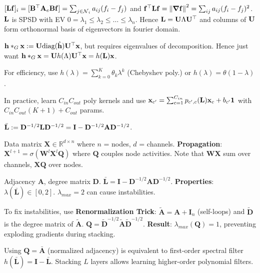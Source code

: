 \begin{theorem}
    \([\vb{L} \vb f]_i = [\vb{B}^\top \vb{A}_e \vb{B} \vb f] = \sum_{j \in \operatorname{\mathcal{N}}_i} a_{ij}(f_i - f_j)\) and \(\vb f^\top \vb{L} \vb f = \norm{\grad \vb f}^2 = \sum_{ij} a_{ij} (f_i - f_j)^2\). \(\vb{L}\) is SPSD with EV \(0 = \lambda_1 \leq \lambda_2 \leq \ldots \leq \lambda_n\).
    Hence \(\vb{L} = \vb{U} \Lambda \vb{U}^\top\) and columns of \(\vb{U}\) form orthonormal basis of eigenvectors in fourier domain.
\end{theorem}

\begin{definition}
    \(\vb{h} *_G \vb{x} := \vb{U} \text{diag}(\hat {\vb{h}}) \vb{U}^\top \vb{x}\), but requires eigenvalues of decomposition. Hence just want \(\vb{h} *_G \vb{x} = \vb{U} h(\Lambda) \vb{U}^\top \vb{x} = h(\vb{L})\vb{x}\).

    For efficiency, use \(h(\lambda) = \sum_{k=0}^K \theta_k \lambda^k\) (Chebyshev poly.) or \(h(\lambda) = \theta (1 - \lambda)\).

    In practice, learn \(C_{in} C_{out}\) poly kernels and use \(\vb{x}_{c'} = \sum_{c=1}^{C_{in}} p_{c', c}(\vb{L})\vb{x}_c + b_{c'}\vb{1}\) with \(C_{in}C_{out}(K+1)+C_{out}\) params.
\end{definition}

\begin{definition}
    \(\bar{\vb{L}} := \vb{D}^{-1/2} \vb{L} \vb{D}^{-1/2} = \vb{I} - \vb{D}^{-1/2}\vb{A} \vb{D}^{-1/2}\).
\end{definition}

\begin{definition}
    Data matrix $\mathbf{X} \in \mathbb{R}^{d \times n}$ where $n$ = nodes, $d$ = channels.
    \textbf{Propagation}: $\mathbf{X}^{l+1} = \sigma(\mathbf{W}^l \mathbf{X}^l \mathbf{Q})$ where $\mathbf{Q}$ couples node activities. Note that \(\mathbf{W}\mathbf{X}\) sum over channels, \(\mathbf{X}\mathbf{Q}\) over nodes.
\end{definition}

\begin{definition}
    Adjacency $\mathbf{A}$, degree matrix $\mathbf{D}$. 
    $\bar{\mathbf{L}} = \mathbf{I} - \mathbf{D}^{-1/2} \mathbf{A} \mathbf{D}^{-1/2}$.
    \textbf{Properties}: $\lambda(\bar{\mathbf{L}}) \in [0, 2]$. $\lambda_{max} = 2$ can cause instabilities.
\end{definition}

\begin{definition}
    To fix instabilities, use \textbf{Renormalization Trick}: 
    $\tilde{\mathbf{A}} = \mathbf{A} + \mathbf{I}_n$ (self-loops) and $\tilde{\mathbf{D}}$ is the degree matrix of $\tilde{\mathbf{A}}$.
    $\mathbf{Q} = \tilde{\mathbf{D}}^{-1/2} \tilde{\mathbf{A}} \tilde{\mathbf{D}}^{-1/2}$.
    \textbf{Result}: $\lambda_{max}(\mathbf{Q}) = 1$, preventing exploding gradients during stacking.
\end{definition}

\begin{theorem}
    Using $\mathbf{Q} = \bar{\mathbf{A}}$ (normalized adjacency) is equivalent to first-order spectral filter $h(\bar{\mathbf{L}}) = \mathbf{I} - \bar{\mathbf{L}}$.
    Stacking $L$ layers allows learning higher-order polynomial filters.
\end{theorem}
